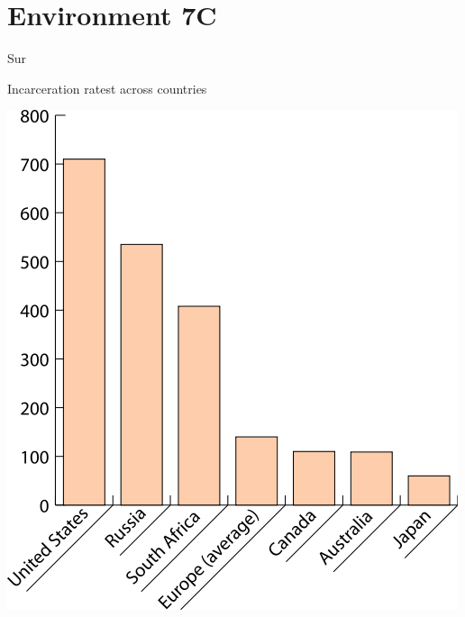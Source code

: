 
\section{Environment 7C}

\begin{chart}{S}{ur}
\caption{Incarceration ratest across countries}
\label{chart:incarceration}
\includegraphics[width=\chartwidth,height=\chartheight]{incarceration}  
\end{chart}

